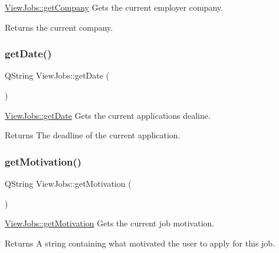 \mbox{\hyperlink{class_view_jobs_a88d7c0a7a79bc7a7e02b524587983bf8}{View\+Jobs\+::get\+Company}} Gets the current employer company. 

\begin{DoxyReturn}{Returns}
the current company. 
\end{DoxyReturn}
\mbox{\label{class_view_jobs_af046f9201cc6031e070b4f9b613a35f9}} 
\subsubsection{\texorpdfstring{get\+Date()}{getDate()}}
{\footnotesize\ttfamily Q\+String View\+Jobs\+::get\+Date (\begin{DoxyParamCaption}{ }\end{DoxyParamCaption})}



\mbox{\hyperlink{class_view_jobs_af046f9201cc6031e070b4f9b613a35f9}{View\+Jobs\+::get\+Date}} Gets the current application\textquotesingle{}s dealine. 

\begin{DoxyReturn}{Returns}
The deadline of the current application. 
\end{DoxyReturn}
\mbox{\label{class_view_jobs_a238ec5365ef2c39baa97670769dfedca}} 
\subsubsection{\texorpdfstring{get\+Motivation()}{getMotivation()}}
{\footnotesize\ttfamily Q\+String View\+Jobs\+::get\+Motivation (\begin{DoxyParamCaption}{ }\end{DoxyParamCaption})}



\mbox{\hyperlink{class_view_jobs_a238ec5365ef2c39baa97670769dfedca}{View\+Jobs\+::get\+Motivation}} Gets the current job motivation. 

\begin{DoxyReturn}{Returns}
A string containing what motivated the user to apply for this job. 
\end{DoxyReturn}
\mbox{\label{class_view_jobs_a91696fde9f0a663bae929390aac8324b}} 
